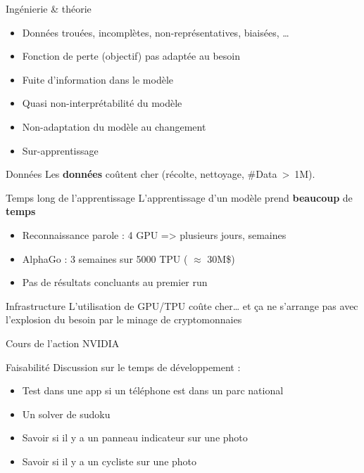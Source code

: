 \begin{frame}{Ingénierie \& théorie}
  \begin{itemize}[<+->]
    \item Données trouées, incomplètes, non-représentatives, biaisées, …
    \item Fonction de perte (objectif) pas adaptée au besoin
    \item Fuite d'information dans le modèle
    \item Quasi non-interprétabilité du modèle
    \item Non-adaptation du modèle au changement
    \item Sur-apprentissage
  \end{itemize}
\end{frame}

\begin{frame}{Données}
  Les \textbf{données} coûtent cher (récolte, nettoyage, \#Data~>~1M). 
\end{frame}

\begin{frame}{Temps long de l'apprentissage}
  L'apprentissage d'un modèle prend \textbf{beaucoup} de \textbf{temps}
  \begin{itemize}[<+->]
    \item Reconnaissance parole : 4 GPU => plusieurs jours, semaines
    \item AlphaGo : 3 semaines sur 5000 TPU ( $\approx$ 30M\$)
    \item Pas de résultats concluants au premier run
  \end{itemize}
\end{frame}

\begin{frame}{Infrastructure}
  L'utilisation de GPU/TPU coûte cher… et ça ne s'arrange pas avec l'explosion du besoin par le minage de cryptomonnaies
  \begin{center}
    \small Cours de l'action NVIDIA
  \end{center}
\end{frame}

\begin{frame}{Faisabilité}
  Discussion sur le temps de développement :
  \begin{itemize}
    \item Test dans une app si un téléphone est dans un parc national
    \item Un solver de sudoku
    \item Savoir si il y a un panneau indicateur sur une photo
    \item Savoir si il y a un cycliste sur une photo
  \end{itemize}
\end{frame}

